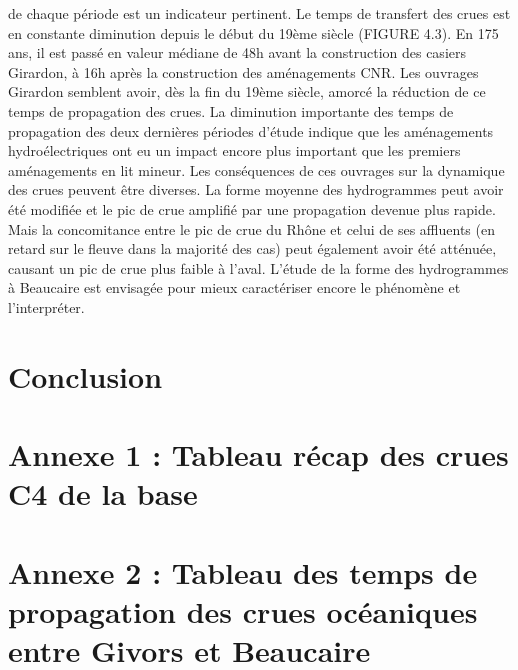\documentclass[11pt]{article}
\begin{document}
de chaque période est un indicateur
pertinent.
Le temps de transfert des crues est en
constante diminution depuis le début du
19ème siècle (FIGURE 4.3). En 175 ans, il est
passé en valeur médiane de 48h avant
la construction des casiers Girardon, à
16h après la construction des aménagements
CNR. Les ouvrages Girardon
semblent avoir, dès la fin du 19ème siècle,
amorcé la réduction de ce temps de propagation
des crues. La diminution importante
des temps de propagation des deux
dernières périodes d’étude indique que les
aménagements hydroélectriques ont eu
un impact encore plus important que les
premiers aménagements en lit mineur.
Les conséquences de ces ouvrages sur
la dynamique des crues peuvent être
diverses. La forme moyenne des hydrogrammes
peut avoir été modifiée et le
pic de crue amplifié par une propagation
devenue plus rapide. Mais la concomitance
entre le pic de crue du Rhône
et celui de ses affluents (en retard sur le
fleuve dans la majorité des cas) peut également
avoir été atténuée, causant un pic
de crue plus faible à l’aval. L’étude de la
forme des hydrogrammes à Beaucaire est
envisagée pour mieux caractériser encore
le phénomène et l’interpréter.


\section{Conclusion}

\section{Annexe 1 : Tableau récap des crues C4 de la base}

\section{Annexe 2 : Tableau des temps de propagation des crues océaniques entre Givors et Beaucaire}


\printbibliography
\end{document}
